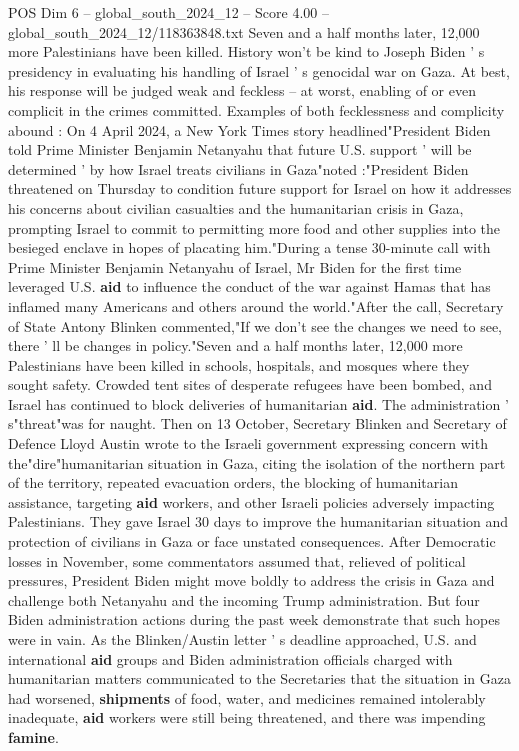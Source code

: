 \begin{textsample}{POS Dim 6 – global\_south\_2024\_12 – Score 4.00 – global\_south\_2024\_12/118363848.txt}  \label{ex:f6_pos_326}
Seven and a half months later, 12,000 more Palestinians have been killed.
History won't be kind to Joseph Biden ' s presidency in evaluating his handling of Israel ' s genocidal war on Gaza.
At best, his response will be judged weak and feckless -- at worst, enabling of or even complicit in the crimes committed.
Examples of both fecklessness and complicity abound : On 4 April 2024, a New York Times story headlined"President Biden told Prime Minister Benjamin Netanyahu that future U.S. support ' will be determined ' by how Israel treats civilians in Gaza"noted :"President Biden threatened on Thursday to condition future support for Israel on how it addresses his concerns about civilian casualties and the humanitarian crisis in Gaza, prompting Israel to commit to permitting more food and other supplies into the besieged enclave in hopes of placating him."During a tense 30-minute call with Prime Minister Benjamin Netanyahu of Israel, Mr Biden for the first time leveraged U.S. \textbf{aid} to influence the conduct of the war against Hamas that has inflamed many Americans and others around the world."After the call, Secretary of State Antony Blinken commented,"If we don't see the changes we need to see, there ' ll be changes in policy."Seven and a half months later, 12,000 more Palestinians have been killed in schools, hospitals, and mosques where they sought safety.
Crowded tent sites of desperate refugees have been bombed, and Israel has continued to block deliveries of humanitarian \textbf{aid}.
The administration ' s"threat"was for naught.
Then on 13 October, Secretary Blinken and Secretary of Defence Lloyd Austin wrote to the Israeli government expressing concern with the"dire"humanitarian situation in Gaza, citing the isolation of the northern part of the territory, repeated evacuation orders, the blocking of humanitarian assistance, targeting \textbf{aid} workers, and other Israeli policies adversely impacting Palestinians.
They gave Israel 30 days to improve the humanitarian situation and protection of civilians in Gaza or face unstated consequences.
After Democratic losses in November, some commentators assumed that, relieved of political pressures, President Biden might move boldly to address the crisis in Gaza and challenge both Netanyahu and the incoming Trump administration.
But four Biden administration actions during the past week demonstrate that such hopes were in vain.
As the Blinken/Austin letter ' s deadline approached, U.S. and international \textbf{aid} groups and Biden administration officials charged with humanitarian matters communicated to the Secretaries that the situation in Gaza had worsened, \textbf{shipments} of food, water, and medicines remained intolerably inadequate, \textbf{aid} workers were still being threatened, and there was impending \textbf{famine}.

\end{textsample}
